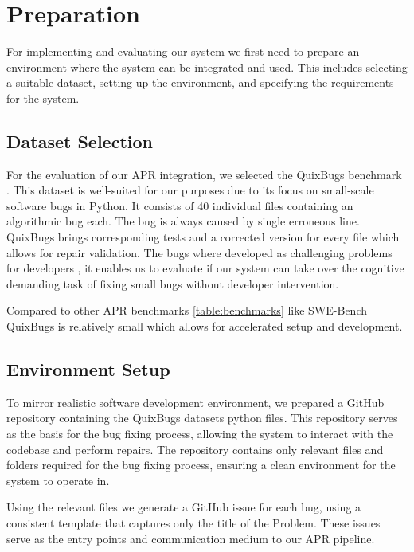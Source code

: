 \section{Preparation}
For implementing and evaluating our system we first need to prepare an environment where the system can be integrated and used. This includes selecting a suitable dataset, setting up the environment, and specifying the requirements for the system.
\subsection{Dataset Selection}
For the evaluation of our APR integration, we selected the QuixBugs benchmark \cite{linQuixBugsMultilingualProgram2017}. This dataset is well-suited for our purposes due to its focus on small-scale software bugs in Python. It consists of 40 individual files containing an algorithmic bug each. The bug is always caused by single erroneous line. QuixBugs brings corresponding tests and a corrected version for every file which allows for repair validation. The bugs where developed as challenging problems for developers \cite{linQuixBugsMultilingualProgram2017}, it enables us to evaluate if our system can take over the cognitive demanding task of fixing small bugs without developer intervention.

Compared to other APR benchmarks \ref{table:benchmarks} like SWE-Bench \cite{jimenezSWEbenchCanLanguage2024} QuixBugs is relatively small which allows for accelerated setup and development.

\subsection{Environment Setup}
To mirror realistic software development environment, we prepared a GitHub repository containing the QuixBugs datasets python files. This repository serves as the basis for the bug fixing process, allowing the system to interact with the codebase and perform repairs. The repository contains only relevant files and folders required for the bug fixing process, ensuring a clean environment for the system to operate in.

Using the relevant files we generate a GitHub issue for each bug, using a consistent template that captures only the title of the Problem. These issues serve as the entry points and communication medium to our APR pipeline.

